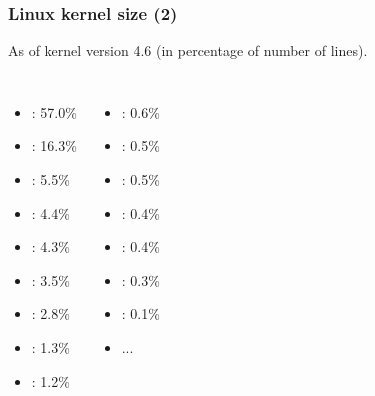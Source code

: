 \begin{frame}
  \frametitle{Linux kernel size (2)}
  As of kernel version 4.6 (in percentage of number of lines).
  \begin{columns}
    \begin{itemize}
    \item {}: 57.0\%
    \item {}: 16.3\%
    \item {}: 5.5\%
    \item {}: 4.4\%
    \item {}: 4.3\%
    \item {}: 3.5\%
    \item {}: 2.8\%
    \item {}: 1.3\%
    \item {}: 1.2\%
    \end{itemize}
    \begin{itemize}
    \item {}: 0.6\%
    \item {}: 0.5\%
    \item {}: 0.5\%
    \item {}: 0.4\%
    \item {}: 0.4\%
    \item {}: 0.3\%
    \item {}: 0.1\%
    \item ...
    \end{itemize}
  \end{columns}
\end{frame}
